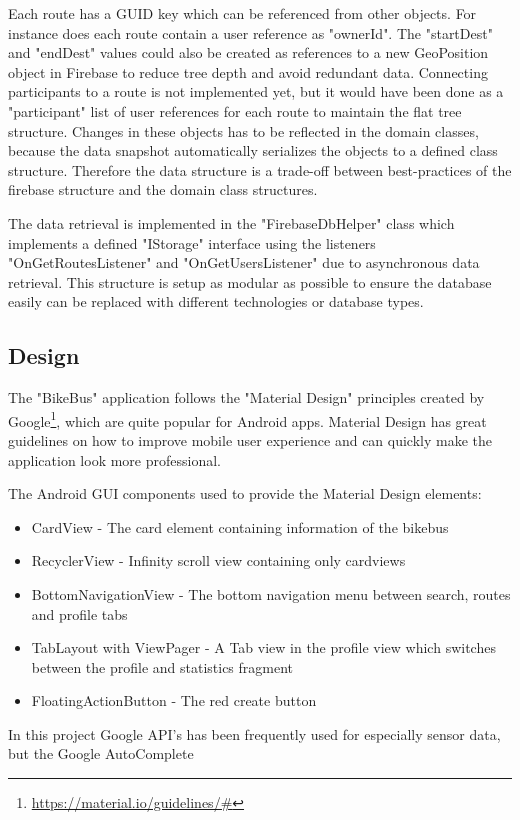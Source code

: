 Each route has a GUID key which can be referenced from other objects. For instance does each route contain a user reference as "ownerId". The "startDest" and "endDest" values could also be created as references to a new GeoPosition object in Firebase to reduce tree depth and avoid redundant data.
Connecting participants to a route is not implemented yet, but it would have been done as a "participant" list of user references for each route to maintain the flat tree structure. Changes in these objects has to be reflected in the domain classes, because the data snapshot automatically serializes the objects to a defined class structure. Therefore the data structure is a trade-off between best-practices of the firebase structure and the domain class structures.

The data retrieval is implemented in the "FirebaseDbHelper" class which implements a defined "IStorage" interface using the listeners "OnGetRoutesListener" and "OnGetUsersListener" due to asynchronous data retrieval. This structure is setup as modular as possible to ensure the database easily can be replaced with different technologies or database types. 

\subsection{Design}
The "BikeBus" application follows the "Material Design" principles created by Google\footnote{\url{https://material.io/guidelines/#}}, which are quite popular for Android apps. Material Design has great guidelines on how to improve mobile user experience and can quickly make the application look more professional.

The Android GUI components used to provide the Material Design elements:
\begin{itemize}
    \item CardView - The card element containing information of the bikebus
    \item RecyclerView - Infinity scroll view containing only cardviews
    \item BottomNavigationView - The bottom navigation menu between search, routes and profile tabs
    \item TabLayout with ViewPager - A Tab view in the profile view which switches between the profile and statistics fragment
    \item FloatingActionButton - The red create button
\end{itemize}

In this project Google API's has been frequently used for especially sensor data, but the Google AutoComplete

